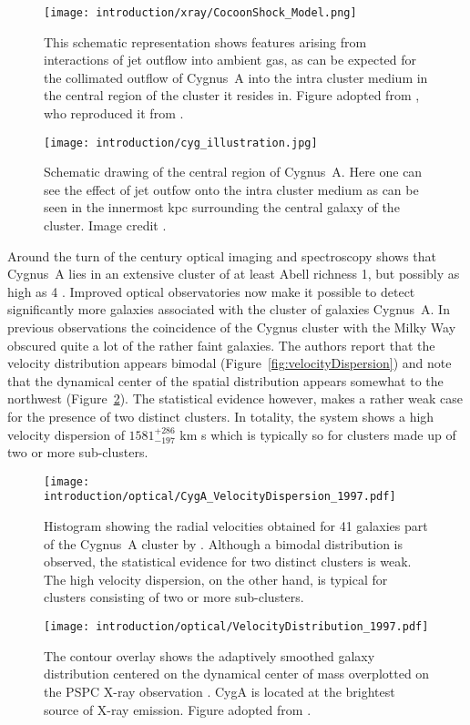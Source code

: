 \documentclass[MScProj_TLRH_ClusterEnergy.tex]{subfiles}
\begin{document}
\begin{figure}
\centering
\texttt{[image: introduction/xray/CocoonShock\_Model.png]}
\caption{This schematic representation shows features arising from interactions
         of jet outflow into ambient gas, as can be expected for the collimated 
         outflow of Cygnus~A into the intra cluster medium in the central region
         of the cluster it resides in. Figure adopted from \citet{1996A&ARv...7....1C},
         who reproduced it from \citet{1989ApJ...345L..21B}.}
\label{fig:JetModel}
\texttt{[image: introduction/cyg\_illustration.jpg]}
\caption{Schematic drawing of the central region of Cygnus~A. Here one can see
         the effect of jet outfow onto the intra cluster medium as can be seen
         in the innermost kpc surrounding the central galaxy of the cluster. 
         Image credit \citet{CygASchematic}.}
\label{fig:CygAJetsColour}
\end{figure}

Around the turn of the century optical imaging and spectroscopy shows that Cygnus~A 
lies in an extensive cluster of at least Abell richness 1, but possibly as high as 4
\citep{1997ApJ...488L..15O}. Improved optical observatories now make it possible to
detect significantly more galaxies associated with the cluster of galaxies Cygnus~A.
In previous observations the coincidence of the Cygnus cluster with the Milky Way 
obscured quite a lot of the rather faint galaxies. The authors report that
the velocity distribution appears bimodal (Figure~\ref{fig:velocityDispersion}) and note 
that the dynamical center of the spatial distribution appears somewhat to the northwest
(Figure~\ref{fig:velocityDistribution}).
The statistical evidence however, makes a rather weak case for the presence of two distinct
clusters. In totality, the system shows a high velocity dispersion of $1581^{+286}_{-197}$
km s which is typically so for clusters made up of two or more sub-clusters.

\begin{figure}
\centering
\texttt{[image: introduction/optical/CygA\_VelocityDispersion\_1997.pdf]}
\caption{Histogram showing the radial velocities obtained for 41 galaxies part of the 
         Cygnus~A cluster by \citet{1997ApJ...488L..15O}. Although a bimodal distribution
         is observed, the statistical evidence for two distinct clusters is weak. The
         high velocity dispersion, on the other hand, is typical for clusters consisting
         of two or more sub-clusters.}
\label{fig:velocityDispersion}
\texttt{[image: introduction/optical/VelocityDistribution\_1997.pdf]}
\caption{The contour overlay shows the adaptively smoothed galaxy distribution
         centered on the dynamical center of mass overplotted on the 
         PSPC X-ray observation \citep{1996MNRAS.278..479R}. CygA is located at the
         brightest source of X-ray emission. Figure adopted from \citep{1997ApJ...488L..15O}. }
\label{fig:velocityDistribution}
\end{figure}
\end{document}
